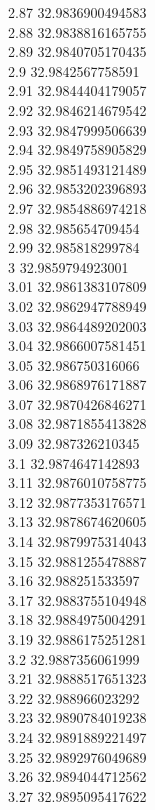 {2.87	32.9836900494583\\
2.88	32.9838816165755\\
2.89	32.9840705170435\\
2.9	32.9842567758591\\
2.91	32.9844404179057\\
2.92	32.9846214679542\\
2.93	32.9847999506639\\
2.94	32.9849758905829\\
2.95	32.9851493121489\\
2.96	32.9853202396893\\
2.97	32.9854886974218\\
2.98	32.985654709454\\
2.99	32.985818299784\\
3	32.9859794923001\\
3.01	32.9861383107809\\
3.02	32.9862947788949\\
3.03	32.9864489202003\\
3.04	32.9866007581451\\
3.05	32.986750316066\\
3.06	32.9868976171887\\
3.07	32.9870426846271\\
3.08	32.9871855413828\\
3.09	32.987326210345\\
3.1	32.9874647142893\\
3.11	32.9876010758775\\
3.12	32.9877353176571\\
3.13	32.9878674620605\\
3.14	32.9879975314043\\
3.15	32.9881255478887\\
3.16	32.988251533597\\
3.17	32.9883755104948\\
3.18	32.9884975004291\\
3.19	32.9886175251281\\
3.2	32.9887356061999\\
3.21	32.9888517651323\\
3.22	32.988966023292\\
3.23	32.9890784019238\\
3.24	32.9891889221497\\
3.25	32.9892976049689\\
3.26	32.9894044712562\\
3.27	32.9895095417622\\
}
